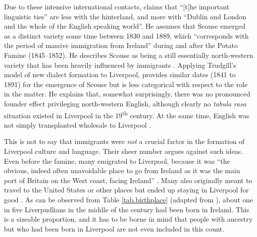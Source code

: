 Due to these intensive international contacts, \citet[15]{knowles1973} claims that ``[t]he important linguistic ties'' are less with the  hinterland, and more with ``Dublin and London and the whole of the English speaking world''.
He assumes that Scouse emerged as a distinct variety some time between 1830 and 1889, which ``corresponds with the period of massive immigration from Ireland'' \parencite[18]{knowles1973} during and after the  Potato Famine (1845--1852).
He describes Scouse as being a still essentially north-western variety that has been heavily influenced by  immigrants \parencite[cf.][51]{knowles1973}.
Applying Trudgill's model of new dialect formation \citep{trudgill1986,trudgill2004} to Liverpool, \textcite{honeybone2007} provides similar dates (1841 to 1891) for the emergence of Scouse but is less categorical with respect to the  role in the matter.
He explains that, somewhat surprisingly, there was no pronounced founder effect privileging north-western English, although clearly no \emph{tabula rasa} situation existed in Liverpool in the 19\textsuperscript{th} century.
At the same time,  English was not simply transplanted wholesale to Liverpool \citep[cf.][117 and 121]{honeybone2007}.

This is not to say that  immigrants were \emph{not} a crucial factor in the formation of Liverpool culture and language.
Their sheer number argues against such ideas.
Even before the famine, many  emigrated to Liverpool, because it was ``the obvious, indeed often unavoidable place to go from Ireland as it was the main port of Britain on the West coast, facing Ireland'' \parencite[114]{honeybone2007}.
Many also originally meant to travel to the United States or other places but ended up staying in Liverpool for good  \citep[cf.][117]{honeybone2007}.
As can be observed from Table \ref{tab.birthplace} (adapted from \cite[249]{pooley2006}), about one in five Liverpudlians in the middle of the century had been born in Ireland.
This is a sizeable proportion, and it has to be borne in mind that people with  ancestry but who had been born in Liverpool are not even included in this count.

